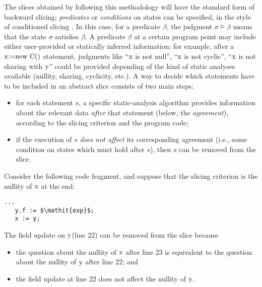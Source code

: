 \documentclass[prodmode,acmtocl]{acmsmall}
\def\state{\ensuremath{\sigma}\xspace}
\newcommand{\0}{\mbox{\bf 0}}
\newcommand{\CODE}[1]{\ensuremath{\mbox{\lstinline!#1!}\xspace}\xspace}
\def\xx{\CODE{x}}
\def\yy{\CODE{y}}
\def\PRED{\beta}
\begin{document}
The slices obtained by following this methodology will have the
standard form of backward slicing; \emph{predicates} or
\emph{conditions} on states can be specified, in the style of
conditioned slicing \cite{Conditioned}.  In this case, for a predicate
$\PRED$, the judgment $\state \models \PRED$ means that the state
$\state$ satisfies $\PRED$.  A predicate $\PRED$ at a certain program
point may include either user-provided or statically inferred
information: for example, after a \CODE{x:=new C()} statement,
judgments like ``\CODE{x} is not null'', ``\CODE{x} is not cyclic'',
``\CODE{x} is not sharing with \CODE{y}'' could be provided depending
of the kind of static analyses available (nullity, sharing, cyclicity,
etc.).  A way to decide which statements have to be included in an
abstract slice consists of two main steps:
\begin{itemize}
\item for each statement $s$, a specific static-analysis algorithm
  provides information about the relevant data \emph{after} that
  statement (below, the \emph{agreement}), according to the slicing
  criterion and the program code;
\item if the execution of $s$ \emph{does not affect} its corresponding
  agreement (i.e., some condition on states which must hold after
  $s$), then $s$ can be removed from the slice.
\end{itemize}

\begin{example}
  \label{ex:conditionsToSlice}
  Consider the following code fragment, and suppose that the slicing
  criterion is the nullity of \xx at the end:

  \vspace{-5mm}

  \begin{lstlisting}[firstnumber=21]
   ...
   y.f := $\mathit{exp}$;
   x := y;
  \end{lstlisting}

  \noindent
  The field update on \yy (line 22) can be removed from the slice
  because
  \begin{itemize}
  \item the question about the nullity of \xx after line $23$ is
    equivalent to the question about the nullity of \yy after line
    $22$; and
  \item the field update at line $22$ does not affect the nullity of
    \yy.
  \end{itemize}
\end{example}
\end{document}
